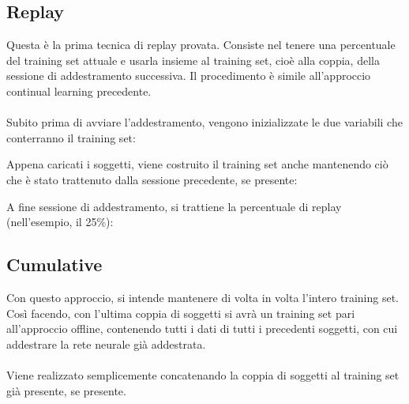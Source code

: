 \subsection{Replay}  %
Questa è la prima tecnica di replay provata. Consiste nel tenere una percentuale del training set attuale e usarla insieme al training set, cioè alla coppia, della sessione di addestramento successiva. Il procedimento è simile all'approccio continual learning precedente.\\\\
Subito prima di avviare l'addestramento, vengono inizializzate le due variabili che conterranno il training set:

Appena caricati i soggetti, viene costruito il training set anche mantenendo ciò che è stato trattenuto dalla sessione precedente, se presente:

A fine sessione di addestramento, si trattiene la percentuale di replay (nell'esempio, il 25\%):


\subsection{Cumulative}  %
Con questo approccio, si intende mantenere di volta in volta l'intero training set. Così facendo, con l'ultima coppia di soggetti si avrà un training set pari all'approccio offline, contenendo tutti i dati di tutti i precedenti soggetti, con cui addestrare la rete neurale già addestrata.\\\\
Viene realizzato semplicemente concatenando la coppia di soggetti al training set già presente, se presente.
